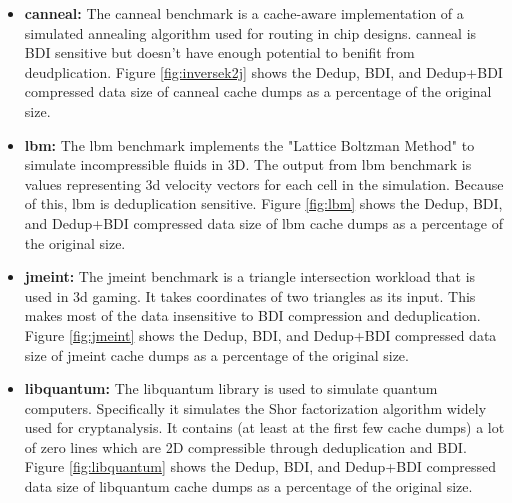 \begin{itemize}
    \item \textbf{canneal:} The canneal benchmark\cite{parsec} is a cache-aware implementation of a simulated annealing algorithm used for routing in chip designs. canneal is BDI sensitive but doesn't have enough potential to benifit from deudplication. Figure \ref{fig:inversek2j} shows the Dedup, BDI, and Dedup+BDI compressed data size of canneal cache dumps as a percentage of the original size.
    \item \textbf{lbm:} The lbm benchmark\cite{spec} implements the "Lattice Boltzman Method" to simulate incompressible fluids in 3D. The output from lbm benchmark is values representing 3d velocity vectors for each cell in the simulation. Because of this, lbm is deduplication sensitive. Figure \ref{fig:lbm} shows the Dedup, BDI, and Dedup+BDI compressed data size of lbm cache dumps as a percentage of the original size.
    \item \textbf{jmeint:} The jmeint benchmark\cite{axbench} is a triangle intersection workload that is used in 3d gaming. It takes coordinates of two triangles as its input. This makes most of the data insensitive to BDI compression and deduplication. Figure \ref{fig:jmeint} shows the Dedup, BDI, and Dedup+BDI compressed data size of jmeint cache dumps as a percentage of the original size.
    \item \textbf{libquantum:} The libquantum library\cite{spec} is used to simulate quantum computers. Specifically it simulates the Shor factorization algorithm widely used for cryptanalysis. It contains (at least at the first few cache dumps) a lot of zero lines which are 2D compressible through deduplication and BDI. Figure \ref{fig:libquantum} shows the Dedup, BDI, and Dedup+BDI compressed data size of libquantum cache dumps as a percentage of the original size.
\end{itemize}
